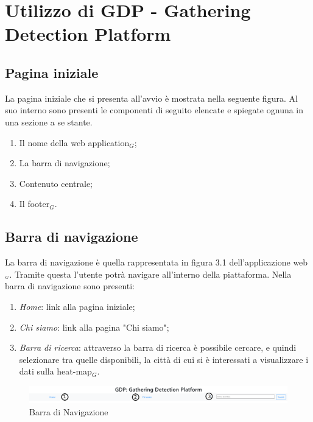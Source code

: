 






\chapter{Utilizzo di GDP - Gathering Detection Platform}\label{UtilizzoDiGDPGatheringDetecionPlatform}

\section{Pagina iniziale}\label{UtilizzoDiGDPGatheringDetecionPlatformPaginaIniziale}
La pagina iniziale che si presenta all'avvio è mostrata nella seguente figura.
Al suo interno sono presenti le componenti di seguito elencate e spiegate ognuna in una sezione a se stante.
\begin{enumerate}
	\item Il nome della web application$_G$;
	\item La barra di navigazione;
	\item Contenuto centrale;
	\item Il footer$_G$.
\end{enumerate}



\section{Barra di navigazione}\label{UtilizzoDiGDPGatheringDetecionPlatformBarraDiNavigazione}

La barra di navigazione è quella rappresentata in figura 3.1 dell'applicazione web$_{\scaleto{G}{3pt}}$. Tramite questa l'utente potrà navigare all'interno della piattaforma. Nella barra di navigazione sono presenti:
\begin{enumerate}
	\item \textit{Home}: link alla pagina iniziale;
	\item \textit{Chi siamo}: link alla pagina "Chi siamo";
	\item \textit{Barra di ricerca}: attraverso la barra di ricerca è possibile cercare, e quindi selezionare tra quelle disponibili, la città di cui si è interessati a visualizzare i dati sulla heat-map$_G$. 
\end{enumerate}
\begin{center}
	\begin{figure}
		\includegraphics[width=1\linewidth]{../immagini/manualeUtente/BarraDiNavigazioe.png}
		\caption{Barra di Navigazione}
	\end{figure}
\end{center}

